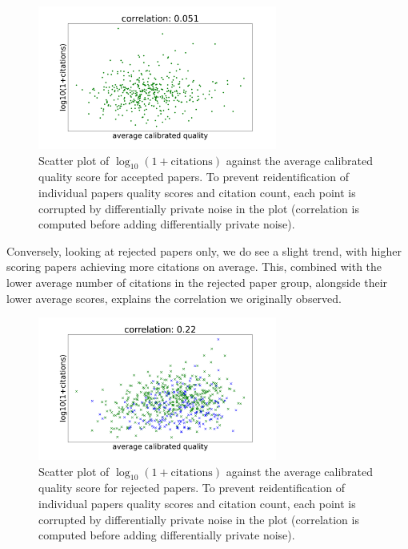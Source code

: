 \begin{figure}[htb]
\includegraphics[width=0.70\textwidth]{diagrams/neurips/citations-vs-average-calibrated-quality-accept.pdf}


\caption{Scatter plot of $\log_{10}(1+\text{citations})$ against the average calibrated quality score for accepted papers. To prevent reidentification of individual papers quality scores and citation count, each point is corrupted by differentially private noise in the plot (correlation is computed before adding differentially private noise).}
\label{citations-vs-average-calibrated-quality-accept}
\end{figure}

Conversely, looking at rejected papers only, we do see a slight trend,
with higher scoring papers achieving more citations on average. This,
combined with the lower average number of citations in the rejected
paper group, alongside their lower average scores, explains the
correlation we originally observed.

\begin{figure}[htb]
\includegraphics[width=0.70\textwidth]{diagrams/neurips/citations-vs-average-calibrated-quality-reject.pdf}


\caption{Scatter plot of $\log_{10}(1+\text{citations})$ against the average calibrated quality score for rejected papers. To prevent reidentification of individual papers quality scores and citation count, each point is corrupted by differentially private noise in the plot (correlation is computed before adding differentially private noise).}
\label{citations-vs-average-calibrated-quality-reject}
\end{figure}

